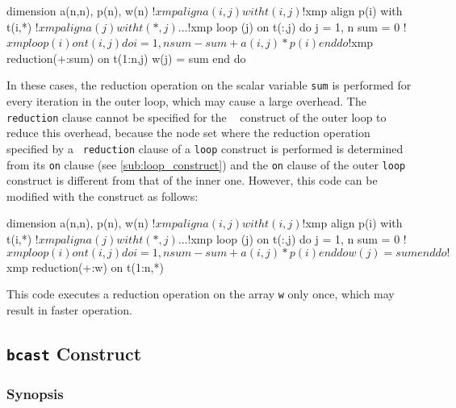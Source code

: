 \begin{description}
\begin{Fexample}
      dimension a(n,n), p(n), w(n)
!$xmp align a(i,j) with t(i,j)
!$xmp align p(i) with t(i,*)
!$xmp align a(j) with t(*,j)
      ...
!$xmp loop (j) on t(:,j)
      do j = 1, n
          sum = 0
!$xmp loop (i) on t(i,j) 
          do i = 1, n
              sum - sum + a(i,j) * p(i)
          end do
!$xmp reduction(+:sum) on t(1:n,j)
          w(j) = sum
      end do
\end{Fexample}

In these cases, the reduction operation on the scalar variable {\tt sum}
is performed for every iteration in the outer loop, which may cause a
large overhead.
The {\tt reduction} clause cannot be specified for the {\tt
{}} construct of the outer loop to reduce this overhead,
%
because the node set where the reduction operation specified by a {\tt
reduction} clause of a {\tt loop} construct is performed is determined
from its {\tt on} clause (see \ref{sub:loop_construct}) and
the {\tt on} clause of the outer {\tt loop} construct is different from
that of the inner one. 
%
However, this code can be modified with the {\tt {}}
construct as follows: 

\begin{Fexample}
      dimension a(n,n), p(n), w(n)
!$xmp align a(i,j) with t(i,j)
!$xmp align p(i) with t(i,*)
!$xmp align a(j) with t(*,j)
      ...
!$xmp loop (j) on t(:,j)
      do j = 1, n
          sum = 0
!$xmp loop (i) on t(i,j) 
          do i = 1, n
              sum - sum + a(i,j) * p(i)
          end do
          w(j) = sum
      end do
!$xmp reduction(+:w) on t(1:n,*)
\end{Fexample}

This code executes a reduction operation on the array {\tt w} only once,
which may result in faster operation.  

\end{description}


\subsection{{\tt bcast} Construct}

\subsubsection*{Synopsis}

